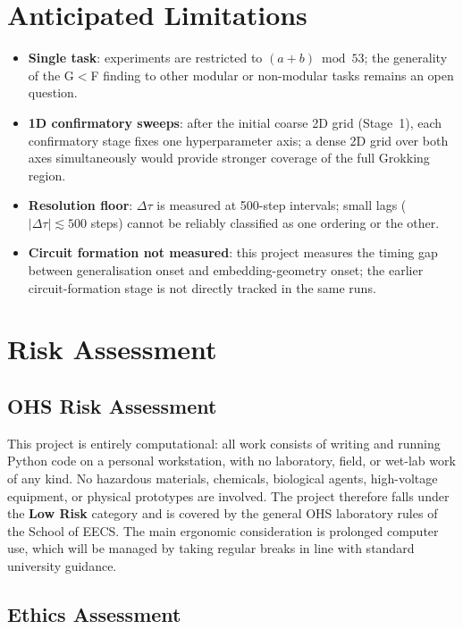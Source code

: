 \documentclass[12pt,openany,a4paper]{book}
\newcommand{\Dtau}{\Delta\tau}
\begin{document}
\section{Anticipated Limitations}

\begin{itemize}
  \item \textbf{Single task}: experiments are restricted to
    $(a+b)\bmod 53$; the generality of the G$<$F finding to other
    modular or non-modular tasks remains an open question.
  \item \textbf{1D confirmatory sweeps}: after the initial coarse 2D
    grid (Stage~1), each confirmatory stage fixes one hyperparameter
    axis; a dense 2D grid over both axes simultaneously would provide
    stronger coverage of the full Grokking region.
  \item \textbf{Resolution floor}: $\Dtau$ is measured at 500-step
    intervals; small lags ($|\Dtau|\lesssim500$ steps) cannot be
    reliably classified as one ordering or the other.
  \item \textbf{Circuit formation not measured}: this project measures
    the timing gap between generalisation onset and embedding-geometry
    onset; the earlier circuit-formation stage is not directly tracked
    in the same runs.
\end{itemize}

\section{Risk Assessment}

\subsection{OHS Risk Assessment}

This project is entirely computational: all work consists of writing and running Python code on a personal workstation, with no laboratory, field, or wet-lab work of any kind.
No hazardous materials, chemicals, biological agents, high-voltage
equipment, or physical prototypes are involved.
The project therefore falls under the \textbf{Low Risk} category
and is covered by the general OHS laboratory rules of the School
of EECS.
The main ergonomic consideration is prolonged computer use, which will be managed by taking regular breaks in line with standard university guidance.

\subsection{Ethics Assessment}
\end{document}
